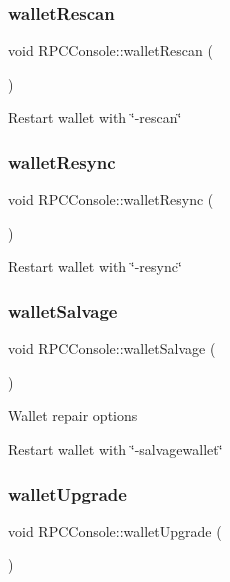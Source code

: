 \subsubsection{\texorpdfstring{walletRescan}{walletRescan}}
{\footnotesize\ttfamily void R\+P\+C\+Console\+::wallet\+Rescan (\begin{DoxyParamCaption}{ }\end{DoxyParamCaption})\hspace{0.3cm}{\ttfamily [slot]}}

Restart wallet with \char`\"{}-\/rescan\char`\"{} \mbox{\label{class_r_p_c_console_a32940def4bbbe99bebd243bace2101da}} 
\subsubsection{\texorpdfstring{walletResync}{walletResync}}
{\footnotesize\ttfamily void R\+P\+C\+Console\+::wallet\+Resync (\begin{DoxyParamCaption}{ }\end{DoxyParamCaption})\hspace{0.3cm}{\ttfamily [slot]}}

Restart wallet with \char`\"{}-\/resync\char`\"{} \mbox{\label{class_r_p_c_console_ad272e3e402b452d470e5d0cc22dfa838}} 
\subsubsection{\texorpdfstring{walletSalvage}{walletSalvage}}
{\footnotesize\ttfamily void R\+P\+C\+Console\+::wallet\+Salvage (\begin{DoxyParamCaption}{ }\end{DoxyParamCaption})\hspace{0.3cm}{\ttfamily [slot]}}

Wallet repair options

Restart wallet with \char`\"{}-\/salvagewallet\char`\"{} \mbox{\label{class_r_p_c_console_a5ba9075f3f7dad2e84302ea3da9f51af}} 
\subsubsection{\texorpdfstring{walletUpgrade}{walletUpgrade}}
{\footnotesize\ttfamily void R\+P\+C\+Console\+::wallet\+Upgrade (\begin{DoxyParamCaption}{ }\end{DoxyParamCaption})\hspace{0.3cm}{\ttfamily [slot]}}

